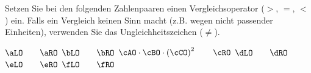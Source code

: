 Setzen Sie bei den folgenden Zahlenpaaren einen Vergleichsoperator ($>$, $=$, $<$) ein. Falls ein Vergleich keinen Sinn macht (z.B. wegen nicht passender Einheiten), verwenden Sie das Ungleichheitszeichen ($\neq$).

\begin{abcliste}
\abc $\aLO \qquad \aRO$
\abc $\bLO \qquad \bRO$
\abc $\cAO\cdot\cBO\cdot\left(\cCO\right)^2 \qquad \cRO$
\abc $\dLO \qquad \dRO$
\abc $\eLO \qquad \eRO$
\abc $\fLO \qquad \fRO$
\end{abcliste}
